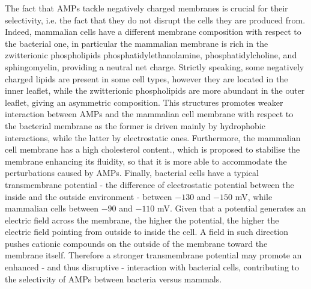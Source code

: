 \documentclass[a4paper,11pt]{extreport}
\begin{document}
The fact that AMPs tackle negatively charged membranes is crucial for their selectivity, i.e. the fact that they do not disrupt the cells they are produced from.\cite{Glukhov2005} Indeed, mammalian cells have a different membrane composition with  respect to the bacterial one, in particular the mammalian membrane is rich in the zwitterionic phospholipids phosphatidylethanolamine, phosphatidylcholine, and sphingomyelin, providing a neutral net charge.\cite{Spector1985,vanMeer2008}
%
Strictly speaking, some negatively charged lipids are present in some cell types, however they are located in the inner leaflet, while the zwitterionic phospholipids are more abundant in the outer leaflet, giving an asymmetric composition.\cite{???}
%
This structures promotes weaker interaction between AMPs and the mammalian cell membrane with respect to the bacterial membrane as the former is driven mainly by hydrophobic interactions, while the latter by electrostatic ones.
%
Furthermore, the mammalian cell membrane has a high cholesterol content.\cite{Yeaman2003, Lai2009}, which is proposed to stabilise the membrane enhancing its fluidity, so that it is more able to accommodate the perturbations caused by AMPs.\cite{Zasloff2002}
%
Finally, bacterial cells have a typical transmembrane potential - the difference of electrostatic potential between the inside and the outside environment - between $-130$ and $-150$ mV, while mammalian cells between $-90$ and $-110$ mV.\cite{Yeaman2003,Matsuzaki2009,Ebenhan2014}
%
Given that a potential generates an electric field across the membrane, the higher the potential, the higher the electric field pointing from outside to inside the cell. A field in such direction pushes cationic compounds on the outside of the membrane toward the membrane itself. Therefore a stronger transmembrane potential may promote an enhanced - and thus disruptive - interaction with bacterial cells, contributing to the selectivity of AMPs between bacteria versus mammals.\cite{Yeaman2003}
\end{document}
